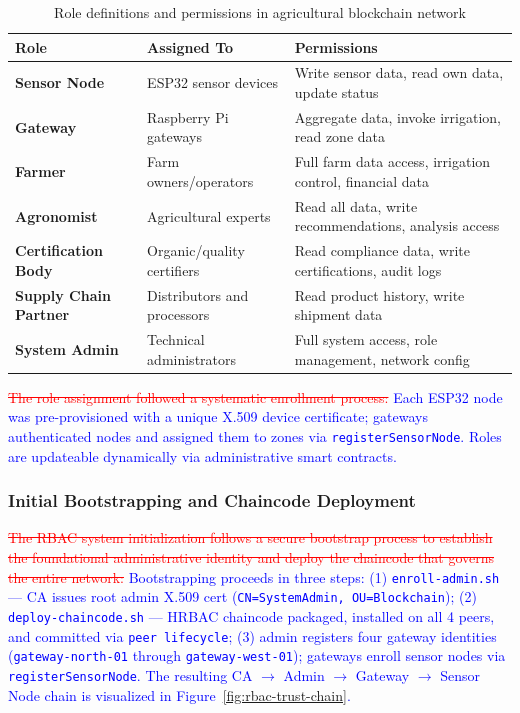 \documentclass[pdflatex,sn-mathphys-num]{sn-jnl}
\theoremstyle{thmstyleone}
\theoremstyle{thmstyletwo}
\theoremstyle{thmstylethree}
\begin{document}
{\begin{table}[htbp]
\centering
\caption{Role definitions and permissions in agricultural blockchain network}
\label{tab:role-definitions}
\begin{tabularx}{\textwidth}{p{}p{}X}
\toprule
\textbf{Role} & \textbf{Assigned To} & \textbf{Permissions} \\
\midrule
\textbf{Sensor Node} & ESP32 sensor devices & Write sensor data, read own data, update status \\
\textbf{Gateway} & Raspberry Pi gateways & Aggregate data, invoke irrigation, read zone data \\
\textbf{Farmer} & Farm owners/operators & Full farm data access, irrigation control, financial data \\
\textbf{Agronomist} & Agricultural experts & Read all data, write recommendations, analysis access \\
\textbf{Certification Body} & Organic/quality certifiers & Read compliance data, write certifications, audit logs \\
\textbf{Supply Chain Partner} & Distributors and processors & Read product history, write shipment data \\
\textbf{System Admin} & Technical administrators & Full system access, role management, network config \\
\bottomrule
\end{tabularx}
\end{table}

\textcolor{red}{\sout{The role assignment followed a systematic enrollment process:}}
\textcolor{blue}{Each ESP32 node was pre-provisioned with a unique X.509 device certificate; gateways authenticated nodes and assigned them to zones via \texttt{registerSensorNode}. Roles are updateable dynamically via administrative smart contracts.}

\subsubsection{Initial Bootstrapping and Chaincode Deployment}
\label{subsubsec:rbac_bootstrapping}

\textcolor{red}{\sout{The RBAC system initialization follows a secure bootstrap process to establish the foundational administrative identity and deploy the chaincode that governs the entire network:}}
\textcolor{blue}{Bootstrapping proceeds in three steps: (1) \texttt{enroll-admin.sh} — CA issues root admin X.509 cert (\texttt{CN=SystemAdmin, OU=Blockchain}); (2) \texttt{deploy-chaincode.sh} — HRBAC chaincode packaged, installed on all 4 peers, and committed via \texttt{peer lifecycle}; (3) admin registers four gateway identities (\texttt{gateway-north-01} through \texttt{gateway-west-01}); gateways enroll sensor nodes via \texttt{registerSensorNode}. The resulting CA $\rightarrow$ Admin $\rightarrow$ Gateway $\rightarrow$ Sensor Node chain is visualized in Figure~\ref{fig:rbac-trust-chain}.}

}
\end{document}
